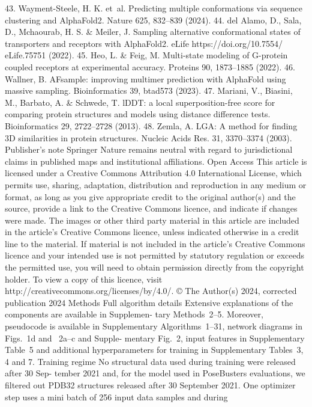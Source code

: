 43.	 Wayment-Steele, H. K. et al. Predicting multiple conformations via sequence clustering
and AlphaFold2. Nature 625, 832–839 (2024).
44.	 del Alamo, D., Sala, D., Mchaourab, H. S. \& Meiler, J. Sampling alternative conformational
states of transporters and receptors with AlphaFold2. eLife https://doi.org/10.7554/
eLife.75751 (2022).
45.	 Heo, L. \& Feig, M. Multi-state modeling of G-protein coupled receptors at experimental
accuracy. Proteins 90, 1873–1885 (2022).
46.	 Wallner, B. AFsample: improving multimer prediction with AlphaFold using massive
sampling. Bioinformatics 39, btad573 (2023).
47.
Mariani, V., Biasini, M., Barbato, A. \& Schwede, T. lDDT: a local superposition-free score for
comparing protein structures and models using distance difference tests. Bioinformatics
29, 2722–2728 (2013).
48.	 Zemla, A. LGA: A method for finding 3D similarities in protein structures. Nucleic Acids Res.
31, 3370–3374 (2003).
Publisher’s note Springer Nature remains neutral with regard to jurisdictional claims in
published maps and institutional affiliations.
Open Access This article is licensed under a Creative Commons Attribution
4.0 International License, which permits use, sharing, adaptation, distribution
and reproduction in any medium or format, as long as you give appropriate
credit to the original author(s) and the source, provide a link to the Creative Commons licence,
and indicate if changes were made. The images or other third party material in this article are
included in the article’s Creative Commons licence, unless indicated otherwise in a credit line
to the material. If material is not included in the article’s Creative Commons licence and your
intended use is not permitted by statutory regulation or exceeds the permitted use, you will
need to obtain permission directly from the copyright holder. To view a copy of this licence,
visit http://creativecommons.org/licenses/by/4.0/.
© The Author(s) 2024, corrected publication 2024
Methods
Full algorithm details
Extensive explanations of the components are available in Supplemen-
tary Methods 2–5. Moreover, pseudocode is available in Supplementary
Algorithms 1–31, network diagrams in Figs. 1d and  2a–c and Supple-
mentary Fig. 2, input features in Supplementary Table 5 and additional
hyperparameters for training in Supplementary Tables 3, 4 and 7.
Training regime
No structural data used during training were released after 30 Sep-
tember 2021 and, for the model used in PoseBusters evaluations, we
filtered out PDB32 structures released after 30 September 2021. One
optimizer step uses a mini batch of 256 input data samples and during
